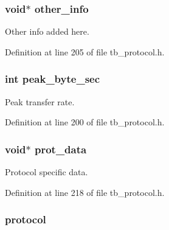 \hypertarget{structtb__prot__stats__t_a2c82f234171703c3ce25a507590a05fd}{
\subsubsection[{other\-\_\-info}]{\setlength{\rightskip}{0pt plus 5cm}void$\ast$ other\-\_\-info}}\label{structtb__prot__stats__t_a2c82f234171703c3ce25a507590a05fd}


Other info added here. 



Definition at line 205 of file tb\-\_\-protocol.\-h.

\hypertarget{structtb__prot__stats__t_add34b08d945695cb3234fa3b74d63ab5}{
\subsubsection[{peak\-\_\-byte\-\_\-sec}]{\setlength{\rightskip}{0pt plus 5cm}int peak\-\_\-byte\-\_\-sec}}\label{structtb__prot__stats__t_add34b08d945695cb3234fa3b74d63ab5}


Peak transfer rate. 



Definition at line 200 of file tb\-\_\-protocol.\-h.

\hypertarget{structtb__prot__stats__t_ab79822e20d19ce95bdf8a3f95bd616d5}{
\subsubsection[{prot\-\_\-data}]{\setlength{\rightskip}{0pt plus 5cm}void$\ast$ prot\-\_\-data}}\label{structtb__prot__stats__t_ab79822e20d19ce95bdf8a3f95bd616d5}


Protocol specific data. 



Definition at line 218 of file tb\-\_\-protocol.\-h.

\hypertarget{structtb__prot__stats__t_a0d2276cd987e688180eedab183cd503e}{
\subsubsection[{protocol}]{ protocol}}\label{structtb__prot__stats__t_a0d2276cd987e688180eedab183cd503e}


